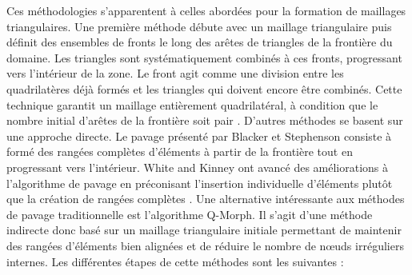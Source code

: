 Ces méthodologies s'apparentent à celles abordées pour la formation de maillages triangulaires. Une première méthode débute avec un maillage triangulaire puis définit des ensembles de fronts le long des arêtes de triangles de la frontière du domaine. Les triangles sont systématiquement combinés à ces fronts, progressant vers l'intérieur de la zone. Le front agit comme une division entre les quadrilatères déjà formés et les triangles qui doivent encore être combinés. Cette technique garantit un maillage entièrement quadrilatéral, à condition que le nombre initial d'arêtes de la frontière soit pair \cite{owen1999q}. D'autres méthodes se basent sur une approche directe. Le pavage présenté par Blacker et Stephenson \cite{blacker1991paving} consiste à formé des rangées complètes d'éléments à partir de la frontière tout en progressant vers l'intérieur. White and Kinney ont avancé des améliorations à l'algorithme de pavage en préconisant l'insertion individuelle d'éléments plutôt que la création de rangées complètes \cite{white1997redesign}. Une alternative intéressante aux méthodes de pavage traditionnelle est l'algorithme Q-Morph. Il s'agit d'une méthode indirecte donc basé sur un maillage triangulaire initiale permettant de maintenir des rangées d'éléments bien alignées et de réduire le nombre de nœuds irréguliers internes. Les différentes étapes de cette méthodes sont les suivantes \cite{owen1999q}:\\

